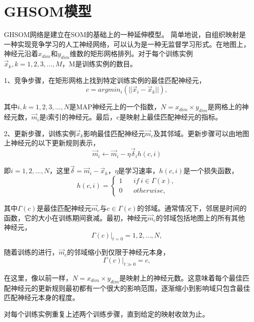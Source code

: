 \section{GHSOM模型}\label{sec:model2}

GHSOM网络是建立在SOM的基础上的一种延伸模型。
简单地说，自组织映射是一种实现竞争学习的人工神经网络，可以认为是一种无监督学习形式。在地图上，神经元沿着$x_{dim}$和$y_{dim}$维数的矩形网格排列。对于每个训练实例$\vec{x}_k,k=1,2,3,...,M$，M是训练实例的数目。

1、竞争步骤，在矩形网格上找到特定训练实例的最佳匹配神经元，
\begin{equation}
c=argmin_{i}(|| \vec{x}_i-\vec{x}_k||),
\end{equation}

其中$i,k=1,2,3,...,N$是MAP神经元上的一个指数，$N=x_{dim}×y_{dim}$是网格上的神经元数，$\vec{m}_i$是i索引的神经元。最后，c是映射上最佳匹配神经元的指标。

2、更新步骤，训练实例$\vec{x}_k$影响最佳匹配神经元$\vec{m}_c$及其邻域。更新步骤可以由地图上神经元的以下更新规则表示，
\begin{equation}
\vec{m}_i\gets \vec{m}_i-\eta \vec{\delta}_ih(c,i)
\end{equation}

即$i=1,2,...,N$，这里$\vec{\delta}=\vec{m}_i-\vec{x}_k$，$\eta$是学习速率，$h(c,i)$是一个损失函数，
\begin{equation}
h(c,i)=\left\{
\begin{aligned}
1 &  & if~i \in \Gamma(x), \\
0 &  & otherwise ,
\end{aligned}
\right.
\end{equation}

其中$\Gamma(c)$是最佳匹配神经元$\vec{m}_c$与$c\in \Gamma(c)$的邻域。通常情况下，邻居是时间的函数，它的大小在训练期间衰减。最初，神经元$\vec{m}_c$的邻域包括地图上的所有其他神经元，
\begin{equation}
\Gamma(c)|_{t=0}={1,2,...,N},
\end{equation}

随着训练的进行，$\vec{m}_c$的邻域缩小到仅限于神经元本身，
\begin{equation}
\Gamma(c)|_{t\gg0}={c},
\end{equation}

在这里，像以前一样，$N=x_{dim}×y_{dim}$是映射上的神经元数。这意味着每个最佳匹配神经元的更新规则最初都有一个很大的影响范围，逐渐缩小到影响域只包含最佳匹配神经元本身的程度。

对每个训练实例重复上述两个训练步骤，直到给定的映射收敛为止。

